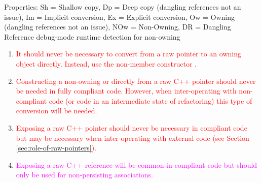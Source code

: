 {\begin{minipage}{\textwidth}
Properties: Sh = Shallow copy, Dp = Deep copy (dangling references not
an issue), Im = Implicit conversion, Ex = Explicit conversion, Ow =
Owning (dangling references not an issue), NOw = Non-Owning, DR =
Dangling Reference debug-mode runtime detection for non-owning

\begin{enumerate}
%
{}\item\label{conv:arcp-owning}\textcolor{red}{It should never be
necessary to convert from a raw pointer to an owning {}
object directly.  Instead, use the non-member constructor
{}.}
%
{}\item\label{conv:arcp-nonowning}\textcolor{red}{Constructing a
non-owning {} or {} directly from a raw
C++ pointer should never be needed in fully compliant code.  However,
when inter-operating with non-compliant code (or code in an intermediate
state of refactoring) this type of conversion will be needed.}
%
{}\item\label{conv:array-expose-raw-ptr}\textcolor{red}{Exposing a raw
C++ pointer should never be necessary in compliant code but may be
necessary when inter-operating with external code (see Section
{}\ref{sec:role-of-raw-pointers}).}
%
{}\item\label{conv:array-expose-raw-ref}\textcolor{magenta}{Exposing a
raw C++ reference will be common in compliant code but should only be
used for non-persisting associations.}
%
\end{enumerate}

\end{minipage}}
